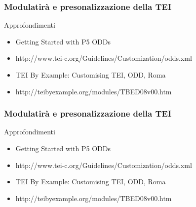 \begin{frame}
    \frametitle{Modulatirà e presonalizzazione della TEI}
    \addtocounter{nframe}{1}

    \begin{block}{Approfondimenti}
            \begin{itemize}
                \item Getting Started with P5 ODDs
                \item [] http://www.tei-c.org/Guidelines/Customization/odds.xml
                \item TEI By Example: Customising TEI, ODD, Roma
                \item [] http://teibyexample.org/modules/TBED08v00.htm
            \end{itemize} 
    \end{block}

\end{frame}


\begin{frame}
    \frametitle{Modulatirà e presonalizzazione della TEI}
    \addtocounter{nframe}{1}

    \begin{block}{Approfondimenti}
            \begin{itemize}
                \item Getting Started with P5 ODDs
                \item [] http://www.tei-c.org/Guidelines/Customization/odds.xml
                \item TEI By Example: Customising TEI, ODD, Roma
                \item [] http://teibyexample.org/modules/TBED08v00.htm
            \end{itemize} 
    \end{block}

\end{frame}